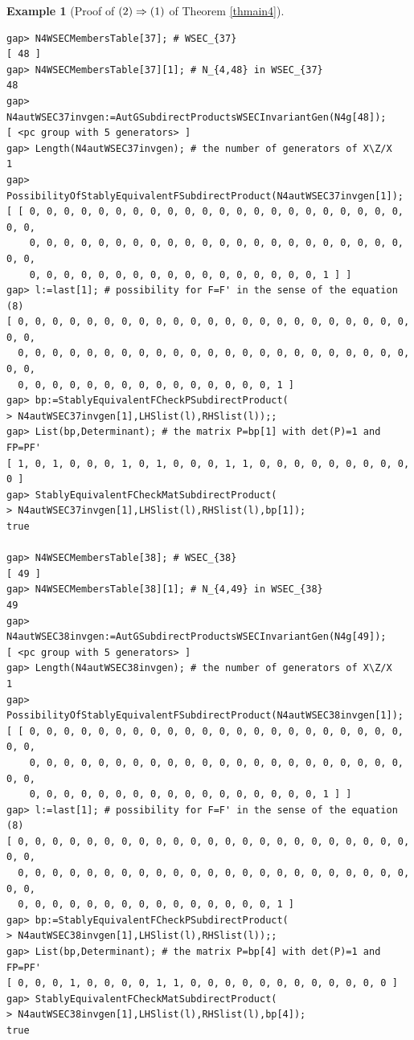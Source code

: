 \documentclass{amsart}
\theoremstyle{plain}
\theoremstyle{definition}
\newtheorem{example}[theorem]{Example}
\theoremstyle{remark}
\begin{document}
\begin{example}[Proof of ${\rm (2)}\Rightarrow {\rm (1)}$ of {Theorem \ref{thmain4}}]
\begin{verbatim}
gap> N4WSECMembersTable[37]; # WSEC_{37}
[ 48 ]
gap> N4WSECMembersTable[37][1]; # N_{4,48} in WSEC_{37}
48
gap> N4autWSEC37invgen:=AutGSubdirectProductsWSECInvariantGen(N4g[48]);
[ <pc group with 5 generators> ]
gap> Length(N4autWSEC37invgen); # the number of generators of X\Z/X
1
gap> PossibilityOfStablyEquivalentFSubdirectProduct(N4autWSEC37invgen[1]);
[ [ 0, 0, 0, 0, 0, 0, 0, 0, 0, 0, 0, 0, 0, 0, 0, 0, 0, 0, 0, 0, 0, 0, 0, 0, 
    0, 0, 0, 0, 0, 0, 0, 0, 0, 0, 0, 0, 0, 0, 0, 0, 0, 0, 0, 0, 0, 0, 0, 0, 
    0, 0, 0, 0, 0, 0, 0, 0, 0, 0, 0, 0, 0, 0, 0, 0, 0, 1 ] ]
gap> l:=last[1]; # possibility for F=F' in the sense of the equation (8)
[ 0, 0, 0, 0, 0, 0, 0, 0, 0, 0, 0, 0, 0, 0, 0, 0, 0, 0, 0, 0, 0, 0, 0, 0, 0, 
  0, 0, 0, 0, 0, 0, 0, 0, 0, 0, 0, 0, 0, 0, 0, 0, 0, 0, 0, 0, 0, 0, 0, 0, 0, 
  0, 0, 0, 0, 0, 0, 0, 0, 0, 0, 0, 0, 0, 0, 0, 1 ]
gap> bp:=StablyEquivalentFCheckPSubdirectProduct(
> N4autWSEC37invgen[1],LHSlist(l),RHSlist(l));;
gap> List(bp,Determinant); # the matrix P=bp[1] with det(P)=1 and FP=PF'
[ 1, 0, 1, 0, 0, 0, 1, 0, 1, 0, 0, 0, 1, 1, 0, 0, 0, 0, 0, 0, 0, 0, 0, 0 ]
gap> StablyEquivalentFCheckMatSubdirectProduct(
> N4autWSEC37invgen[1],LHSlist(l),RHSlist(l),bp[1]);
true

gap> N4WSECMembersTable[38]; # WSEC_{38}
[ 49 ]
gap> N4WSECMembersTable[38][1]; # N_{4,49} in WSEC_{38}
49
gap> N4autWSEC38invgen:=AutGSubdirectProductsWSECInvariantGen(N4g[49]);
[ <pc group with 5 generators> ]
gap> Length(N4autWSEC38invgen); # the number of generators of X\Z/X
1
gap> PossibilityOfStablyEquivalentFSubdirectProduct(N4autWSEC38invgen[1]);
[ [ 0, 0, 0, 0, 0, 0, 0, 0, 0, 0, 0, 0, 0, 0, 0, 0, 0, 0, 0, 0, 0, 0, 0, 0, 
    0, 0, 0, 0, 0, 0, 0, 0, 0, 0, 0, 0, 0, 0, 0, 0, 0, 0, 0, 0, 0, 0, 0, 0, 
    0, 0, 0, 0, 0, 0, 0, 0, 0, 0, 0, 0, 0, 0, 0, 0, 0, 1 ] ]
gap> l:=last[1]; # possibility for F=F' in the sense of the equation (8)
[ 0, 0, 0, 0, 0, 0, 0, 0, 0, 0, 0, 0, 0, 0, 0, 0, 0, 0, 0, 0, 0, 0, 0, 0, 0, 
  0, 0, 0, 0, 0, 0, 0, 0, 0, 0, 0, 0, 0, 0, 0, 0, 0, 0, 0, 0, 0, 0, 0, 0, 0, 
  0, 0, 0, 0, 0, 0, 0, 0, 0, 0, 0, 0, 0, 0, 0, 1 ]
gap> bp:=StablyEquivalentFCheckPSubdirectProduct(
> N4autWSEC38invgen[1],LHSlist(l),RHSlist(l));;
gap> List(bp,Determinant); # the matrix P=bp[4] with det(P)=1 and FP=PF'
[ 0, 0, 0, 1, 0, 0, 0, 0, 1, 1, 0, 0, 0, 0, 0, 0, 0, 0, 0, 0, 0, 0 ]
gap> StablyEquivalentFCheckMatSubdirectProduct(
> N4autWSEC38invgen[1],LHSlist(l),RHSlist(l),bp[4]);
true


\end{verbatim}
\end{example}
\end{document}
